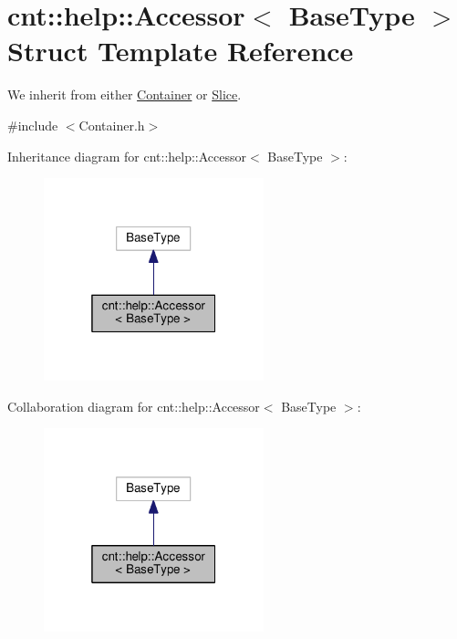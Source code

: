 \hypertarget{structcnt_1_1help_1_1Accessor}{}\section{cnt\+:\+:help\+:\+:Accessor$<$ Base\+Type $>$ Struct Template Reference}
\label{structcnt_1_1help_1_1Accessor}


We inherit from either \textquotesingle{}\hyperlink{classcnt_1_1help_1_1Container}{Container}\textquotesingle{} or \textquotesingle{}\hyperlink{classcnt_1_1help_1_1Slice}{Slice}\textquotesingle{}.  




{\ttfamily \#include $<$Container.\+h$>$}



Inheritance diagram for cnt\+:\+:help\+:\+:Accessor$<$ Base\+Type $>$\+:\nopagebreak
\begin{figure}[H]
\begin{center}
\leavevmode
\includegraphics[width=181pt]{structcnt_1_1help_1_1Accessor__inherit__graph}
\end{center}
\end{figure}


Collaboration diagram for cnt\+:\+:help\+:\+:Accessor$<$ Base\+Type $>$\+:\nopagebreak
\begin{figure}[H]
\begin{center}
\leavevmode
\includegraphics[width=181pt]{structcnt_1_1help_1_1Accessor__coll__graph}
\end{center}
\end{figure}
